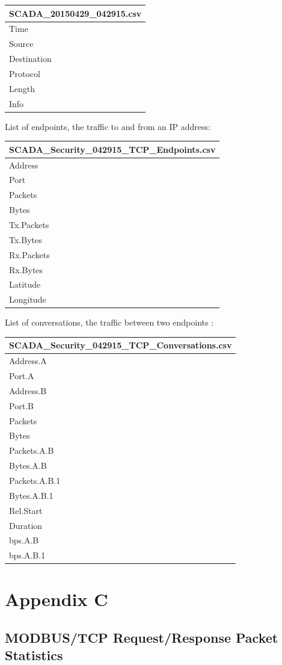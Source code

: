\documentclass[11pt,a4paper]{article}
\begin{document}
\begin{longtable}[c]{@{}l@{}}
\toprule
SCADA\_20150429\_042915.csv\tabularnewline
\midrule
\endhead
Time\tabularnewline
Source\tabularnewline
Destination\tabularnewline
Protocol\tabularnewline
Length\tabularnewline
Info\tabularnewline
\bottomrule
\end{longtable}

List of endpoints, the traffic to and from an IP address:

\begin{longtable}[c]{@{}l@{}}
\toprule
SCADA\_Security\_042915\_TCP\_Endpoints.csv\tabularnewline
\midrule
\endhead
Address\tabularnewline
Port\tabularnewline
Packets\tabularnewline
Bytes\tabularnewline
Tx.Packets\tabularnewline
Tx.Bytes\tabularnewline
Rx.Packets\tabularnewline
Rx.Bytes\tabularnewline
Latitude\tabularnewline
Longitude\tabularnewline
\bottomrule
\end{longtable}

List of conversations, the traffic between two endpoints :

\begin{longtable}[c]{@{}l@{}}
\toprule
SCADA\_Security\_042915\_TCP\_Conversations.csv\tabularnewline
\midrule
\endhead
Address.A\tabularnewline
Port.A\tabularnewline
Address.B\tabularnewline
Port.B\tabularnewline
Packets\tabularnewline
Bytes\tabularnewline
Packets.A.B\tabularnewline
Bytes.A.B\tabularnewline
Packets.A.B.1\tabularnewline
Bytes.A.B.1\tabularnewline
Rel.Start\tabularnewline
Duration\tabularnewline
bps.A.B\tabularnewline
bps.A.B.1\tabularnewline
\bottomrule
\end{longtable}

\clearpage

\section*{Appendix C}\label{appendix-c}

\subsection*{MODBUS/TCP Request/Response Packet
Statistics}\label{modbustcp-requestresponse-packet-statistics}
\end{document}
